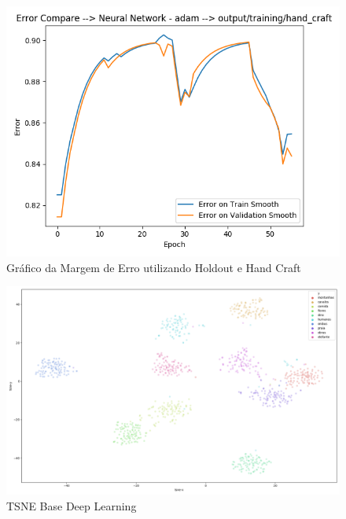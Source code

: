 \documentclass[
article,			%
11pt,				%
oneside,			%
a4paper,			%
english,			%
brazil,				%
sumario=tradicional,
]{abntex2}
\begin{document}
\begin{anexosenv}
\begin{figure}[htb]
	\caption{\label{error-neural-network-holdout-hand-craft}Gráfico da Margem de Erro utilizando Holdout e Hand Craft}
	\begin{center}
		\includegraphics[scale=0.5]{error-neural-network-hodoult-hand-craft.png}
	\end{center}
\end{figure}

	\begin{figure}[htb]
		\caption{\label{tsne-deep-data}TSNE Base Deep Learning}
		\begin{center}
			\includegraphics[scale=0.3]{tsne-graph-deep.png}
		\end{center}
	\end{figure}


\end{anexosenv}
\end{document}
